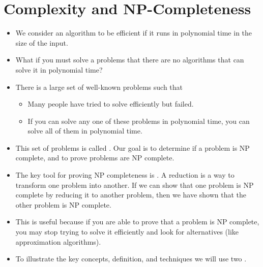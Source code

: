 \documentclass[a4paper,12pt]{article}
\begin{document}
\section{Complexity and NP-Completeness}
\begin{itemize}
    \item We consider an algorithm to be efficient if it runs in polynomial time in the size of the input.
    \item What if you must solve a problems that there are no algorithms that can solve it in polynomial time?
    \item There is a large set of well-known problems such that \begin{itemize}
        \item Many people have tried to solve efficiently but failed.
        \item If you can solve any one of these problems in polynomial time, you can solve all of them in polynomial time.
    \end{itemize}
    \item This set of problems is called . Our goal is to determine if a problem is NP complete, and to prove problems are NP complete.
    \item The key tool for proving NP completeness is . A reduction is a way to transform one problem into another. If we can show that one problem is NP complete by reducing it to another problem, then we have shown that the other problem is NP complete.
    \item This is useful because if you are able to prove that a problem is NP complete, you may stop trying to solve it efficiently and look for alternatives (like approximation algorithms).
    \item To illustrate the key concepts, definition, and techniques we will use two .
\end{itemize}
\end{document}
